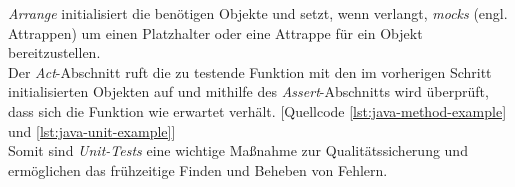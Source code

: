 \textit{Arrange} initialisiert die benötigen Objekte und setzt, wenn verlangt, \textit{mocks} (engl. Attrappen) um einen Platzhalter oder eine Attrappe für ein Objekt bereitzustellen.\\ Der \textit{Act}-Abschnitt ruft die zu testende Funktion mit den im vorherigen Schritt initialisierten Objekten auf und mithilfe des \textit{Assert}-Abschnitts wird überprüft, dass sich die Funktion wie erwartet verhält. \cite*{ikechiHowStructureUnit2021} [Quellcode \ref{lst:java-method-example} und \ref{lst:java-unit-example}]\\
\vspace{-.3cm}
Somit sind \textit{Unit-Tests} eine wichtige Maßnahme zur Qualitätssicherung und ermöglichen das frühzeitige Finden und Beheben von Fehlern.\\
\vspace{-.3cm}

